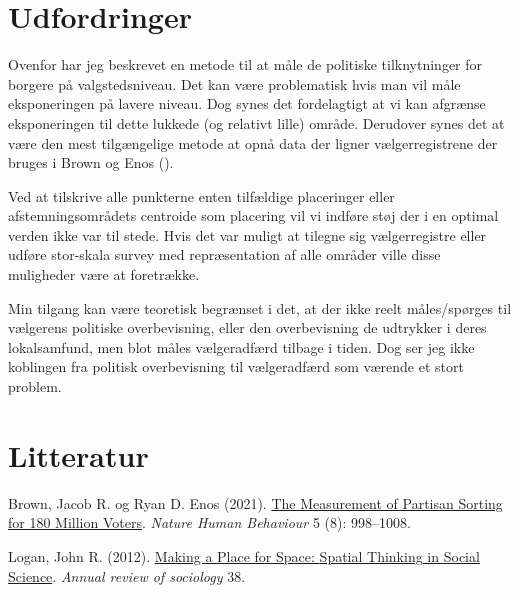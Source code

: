 \documentclass[
  a4paper,
  DIV=11,
  numbers=noendperiod]{scrartcl}
\newlength{\cslhangindent}
\newenvironment{CSLReferences}[2] %
 {\begin{list}{}{%
  \setlength{\itemindent}{0pt}
  \setlength{\leftmargin}{0pt}
  \setlength{\parsep}{0pt}
  \ifodd #1
   \setlength{\leftmargin}{\cslhangindent}
   \setlength{\itemindent}{-1\cslhangindent}
  \fi
  \setlength{\itemsep}{#2\baselineskip}}}
 {\end{list}}
\begin{document}
\section{Udfordringer}\label{udfordringer}

Ovenfor har jeg beskrevet en metode til at måle de politiske
tilknytninger for borgere på valgstedsniveau. Det kan være problematisk
hvis man vil måle eksponeringen på lavere niveau. Dog synes det
fordelagtigt at vi kan afgrænse eksponeringen til dette lukkede (og
relativt lille) område. Derudover synes det at være den mest
tilgængelige metode at opnå data der ligner vælgerregistrene der bruges
i Brown og Enos ().

Ved at tilskrive alle punkterne enten tilfældige placeringer eller
afstemningsområdets centroide som placering vil vi indføre støj der i en
optimal verden ikke var til stede. Hvis det var muligt at tilegne sig
vælgerregistre eller udføre stor-skala survey med repræsentation af alle
områder ville disse muligheder være at foretrække.

Min tilgang kan være teoretisk begrænset i det, at der ikke reelt
måles/spørges til vælgerens politiske overbevisning, eller den
overbevisning de udtrykker i deres lokalsamfund, men blot måles
vælgeradfærd tilbage i tiden. Dog ser jeg ikke koblingen fra politisk
overbevisning til vælgeradfærd som værende et stort problem.

\section{Litteratur}\label{litteratur}

\label{refs}
\begin{CSLReferences}{1}{1}
Brown, Jacob R. og Ryan D. Enos (2021).
\href{https://doi.org/10.1038/s41562-021-01066-z}{The Measurement of
Partisan Sorting for 180 Million Voters}. \emph{Nature Human Behaviour}
5 (8): 998--1008.

Logan, John R. (2012).
\href{https://doi.org/10.1146/annurev-soc-071811-145531}{Making a
{Place} for {Space}: {Spatial Thinking} in {Social Science}}.
\emph{Annual review of sociology} 38.

\end{CSLReferences}
\end{document}
